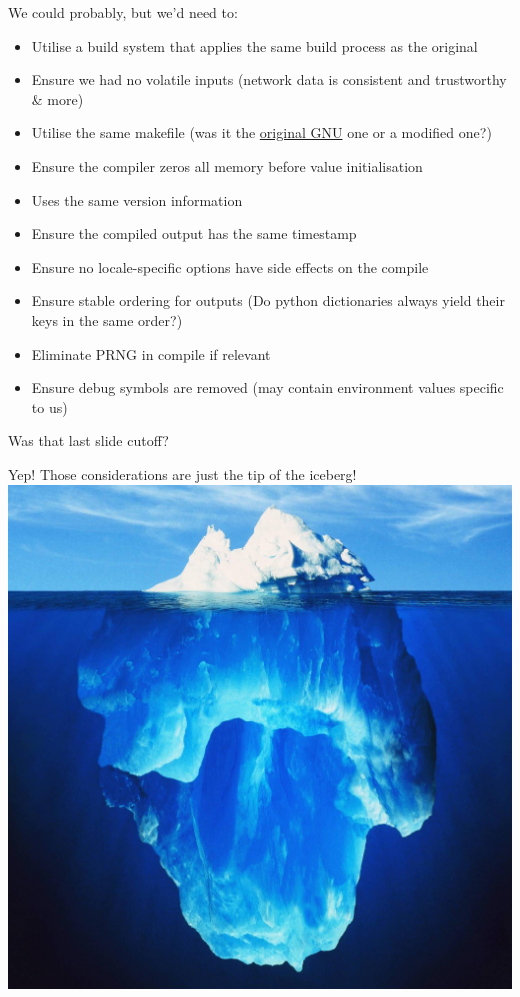 \documentclass{beamer}
\begin{document}
\begin{frame}
    We could probably, but we'd need to:
    \begin{itemize}
        \item Utilise a build system that applies the same build process as the original
        \item Ensure we had no volatile inputs (network data is consistent and trustworthy \& more)
        \item Utilise the same makefile (was it the \href{https://git.savannah.gnu.org/cgit/findutils.git/tree/Makefile.am}{\color{blue}original GNU} one or a modified one?)
        \item Ensure the compiler zeros all memory before value initialisation
        \item Uses the same version information
        \item Ensure the compiled output has the same timestamp
        \item Ensure no locale-specific options have side effects on the compile
        \item Ensure stable ordering for outputs (Do python dictionaries always yield their keys in the same order?)
        \item Eliminate PRNG in compile if relevant
        \item Ensure debug symbols are removed (may contain environment values specific to us)
    \end{itemize}
\end{frame}

\begin{frame}
    \centering
    Was that last slide cutoff?
\end{frame}

\begin{frame}
    \centering
    Yep! Those considerations are just the tip of the iceberg!
    \includegraphics[width=\textwidth]{../resources/iceberg.png}
\end{frame}
\end{document}
